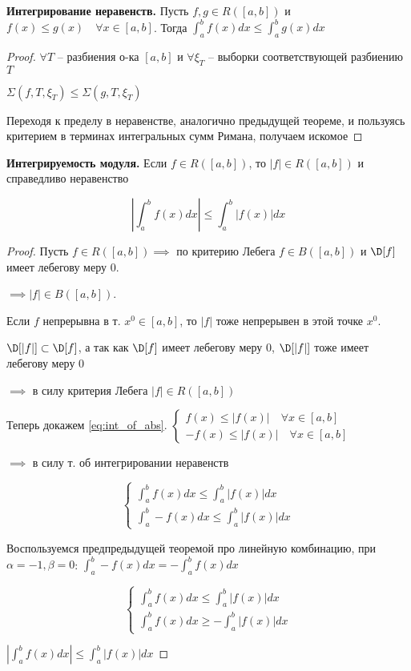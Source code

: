 \begin{theorem}
    \textbf{Интегрирование неравенств.}
    Пусть $f, g \in R([a, b])$ и $f(x) \leqslant g(x)\quad \forall x \in [a, b]$.
    Тогда $\int_a^b f(x)dx \leqslant \int_a^b g(x)dx$ 
\end{theorem}
\begin{proof}
    $\forall T$ -- разбиения о-ка $[a, b]$ и $\forall\xi_T$ -- выборки соответствующей разбиению $T$

    $\Sigma(f, T, \xi_T) \leqslant \Sigma(g, T, \xi_T)$

    Переходя к пределу в неравенстве, аналогично предыдущей теореме, и пользуясь критерием в терминах интегральных сумм Римана, получаем искомое
\end{proof}
\begin{theorem}
    \textbf{Интегрируемость модуля.} Если $f \in R([a, b])$, то $|f| \in R([a, b])$ и справедливо неравенство

    \begin{equation}
        \left|\int_a^b f(x)dx\right| \leqslant \int_a^b |f(x)|dx
        \label{eq:int_of_abs}
    \end{equation}
\end{theorem}
\begin{proof}
    Пусть $f \in R([a, b]) \implies$ по критерию Лебега $f \in B([a, b])$
    и $\D[f]$ имеет лебегову меру 0.

    $\implies |f| \in B([a, b])$.

    Если $f$ непрерывна в т. $x^0 \in [a, b]$, то $|f|$ тоже непрерывен
    в этой точке $x^0$.

    $\D[|f|] \subset \D[f]$, а так как $\D[f]$ имеет лебегову меру 0,
    $\D[|f|]$ тоже имеет лебегову меру 0

    $\implies$ в силу критерия Лебега \underline{$|f| \in R([a, b])$}

    Теперь докажем \eqref{eq:int_of_abs}.
    $\left\{\begin{aligned}
        f(x) \leqslant |f(x)|\quad \forall x \in [a, b] \\
        -f(x) \leqslant |f(x)| \quad \forall x \in [a, b]
    \end{aligned}\right.$

    $\implies$ в силу т. об интегрировании неравенств

    \[ \left\{ \begin{aligned}
    \int_a^b f(x)dx \leqslant \int_a^b |f(x)| dx \\
    \int_a^b -f(x)dx \leqslant \int_a^b |f(x)|dx
    \end{aligned} \right. \]

    Воспользуемся предпредыдущей теоремой про линейную комбинацию, при $\alpha = -1, \beta = 0$: $\int_a^b -f(x)dx = -\int_a^b f(x)dx$

    \[ \left\{ \begin{aligned}
    \int_a^b f(x)dx \leqslant \int_a^b |f(x)| dx \\
    \int_a^b f(x)dx \geqslant -\int_a^b |f(x)|dx
    \end{aligned} \right. \]

    $\left|\int_a^b f(x)dx\right| \leqslant \int_a^b |f(x)|dx$
\end{proof}

